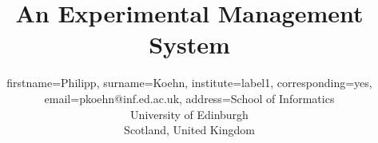\documentclass{pbml}
\begin{document}

\title{An Experimental Management System}




\author{
  firstname=Philipp,
  surname=Koehn,
  institute=label1,
  corresponding=yes,
  email={pkoehn@inf.ed.ac.uk},
  address={School of Informatics\\ University of Edinburgh\\ Scotland, United Kingdom}
}




\maketitle
\end{document}
